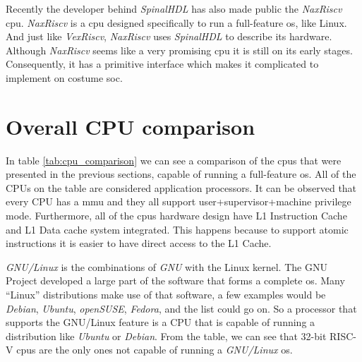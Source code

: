 Recently the developer behind \textit{SpinalHDL} has also made public the \textit{NaxRiscv} \acrshort{cpu}. \textit{NaxRiscv} is a \acrshort{cpu} designed specifically to run a full-feature \acrlong{os}, like Linux. And just like \textit{VexRiscv}, \textit{NaxRiscv} uses \textit{SpinalHDL} to describe its hardware. Although \textit{NaxRiscv} seems like a very promising \acrshort{cpu} it is still on its early stages. Consequently, it has a primitive interface which makes it complicated to implement on costume \acrfull{soc}.


\section{Overall CPU comparison}
\label{section:cpu_comparison}
In table \ref*{tab:cpu_comparison} we can see a comparison of the \acrshort{cpu}s that were presented in the previous sections, capable of running a full-feature \acrfull{os}. All of the CPUs on the table are considered application processors. It can be observed that every CPU has a \acrfull{mmu} and they all support \acrshort{user}+\acrshort{supervisor}+\acrshort{machine} privilege mode. Furthermore, all of the \acrshort{cpu}s hardware design have L1 Instruction Cache and L1 Data cache system integrated. This happens because to support atomic instructions it is easier to have direct access to the L1 Cache.

\textit{GNU/Linux} is the combinations of \textit{GNU} with the Linux kernel. The GNU Project developed a large part of the software that forms a complete \acrfull{os}. Many \enquote{Linux} distributions make use of that software, a few examples would be \textit{Debian}, \textit{Ubuntu}, \textit{openSUSE}, \textit{Fedora}, and the list could go on. So a processor that supports the GNU/Linux feature is a CPU that is capable of running a distribution like \textit{Ubuntu} or \textit{Debian}. From the table, we can see that 32-bit RISC-V \acrshort{cpu}s are the only ones not capable of running a \textit{GNU/Linux} \acrfull{os}.

